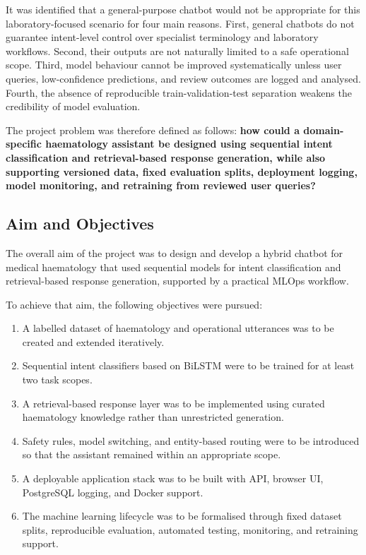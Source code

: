 It was identified that a general-purpose chatbot would not be appropriate for this laboratory-focused scenario for four main reasons. First, general chatbots do not guarantee intent-level control over specialist terminology and laboratory workflows. Second, their outputs are not naturally limited to a safe operational scope. Third, model behaviour cannot be improved systematically unless user queries, low-confidence predictions, and review outcomes are logged and analysed. Fourth, the absence of reproducible train-validation-test separation weakens the credibility of model evaluation.

The project problem was therefore defined as follows: \textbf{how could a domain-specific haematology assistant be designed using sequential intent classification and retrieval-based response generation, while also supporting versioned data, fixed evaluation splits, deployment logging, model monitoring, and retraining from reviewed user queries?}

\subsection{Aim and Objectives}

The overall aim of the project was to design and develop a hybrid chatbot for medical haematology that used sequential models for intent classification and retrieval-based response generation, supported by a practical MLOps workflow.

To achieve that aim, the following objectives were pursued:

\begin{enumerate}

\item A labelled dataset of haematology and operational utterances was to be created and extended iteratively.

\item Sequential intent classifiers based on BiLSTM were to be trained for at least two task scopes.

\item A retrieval-based response layer was to be implemented using curated haematology knowledge rather than unrestricted generation.

\item Safety rules, model switching, and entity-based routing were to be introduced so that the assistant remained within an appropriate scope.

\item A deployable application stack was to be built with API, browser UI, PostgreSQL logging, and Docker support.

\item The machine learning lifecycle was to be formalised through fixed dataset splits, reproducible evaluation, automated testing, monitoring, and retraining support.

\end{enumerate}

